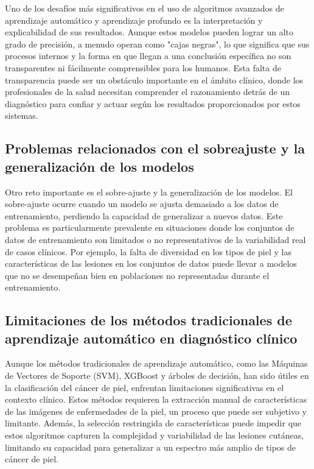 Uno de los desafíos más significativos en el uso de algoritmos avanzados de aprendizaje automático y aprendizaje profundo es la interpretación y explicabilidad de sus resultados. Aunque estos modelos pueden lograr un alto grado de precisión, a menudo operan como "cajas negras", lo que significa que sus procesos internos y la forma en que llegan a una conclusión específica no son transparentes ni fácilmente comprensibles para los humanos. Esta falta de transparencia puede ser un obstáculo importante en el ámbito clínico, donde los profesionales de la salud necesitan comprender el razonamiento detrás de un diagnóstico para confiar y actuar según los resultados proporcionados por estos sistemas. %


\subsection*{Problemas relacionados con el sobreajuste y la generalización de los modelos}
Otro reto importante es el sobre-ajuste y la generalización de los modelos. El sobre-ajuste ocurre cuando un modelo se ajusta demasiado a los datos de entrenamiento, perdiendo la capacidad de generalizar a nuevos datos. Este problema es particularmente prevalente en situaciones donde los conjuntos de datos de entrenamiento son limitados o no representativos de la variabilidad real de casos clínicos. Por ejemplo, la falta de diversidad en los tipos de piel y las características de las lesiones en los conjuntos de datos puede llevar a modelos que no se desempeñan bien en poblaciones no representadas durante el entrenamiento. %

\subsection*{Limitaciones de los métodos tradicionales de aprendizaje automático en diagnóstico clínico}
Aunque los métodos tradicionales de aprendizaje automático, como las Máquinas de Vectores de Soporte (SVM), XGBoost y árboles de decisión, han sido útiles en la clasificación del cáncer de piel, enfrentan limitaciones significativas en el contexto clínico. Estos métodos requieren la extracción manual de características de las imágenes de enfermedades de la piel, un proceso que puede ser subjetivo y limitante. Además, la selección restringida de características puede impedir que estos algoritmos capturen la complejidad y variabilidad de las lesiones cutáneas, limitando su capacidad para generalizar a un espectro más amplio de tipos de cáncer de piel.%

